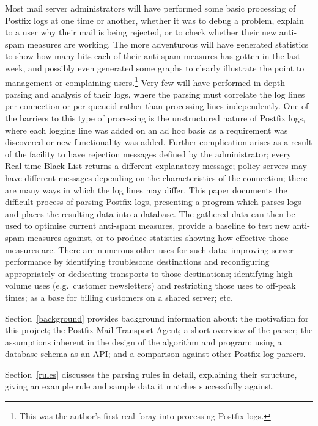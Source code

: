 \documentclass[a4paper,12pt,draft]{article}
\begin{document}
Most mail server administrators will have performed some basic processing
of Postfix logs at one time or another, whether it was to debug a problem,
explain to a user why their mail is being rejected, or to check whether
their new anti-spam measures are working.  The more adventurous will have
generated statistics to show how many hits each of their anti-spam measures
has gotten in the last week, and possibly even generated some graphs to
clearly illustrate the point to management or complaining
users.\footnote{This was the author's first real foray into processing
Postfix logs.}  Very few will have performed in-depth parsing and analysis
of their logs, where the parsing must correlate the log lines
per-connection or per-queueid rather than processing lines independently.
One of the barriers to this type of processing is the unstructured nature
of Postfix logs, where each logging line was added on an ad hoc basis as a
requirement was discovered or new functionality was added.  Further
complication arises as a result of the facility to have rejection messages
defined by the administrator; every Real-time Black List returns a
different explanatory message; policy servers may have different messages
depending on the characteristics of the connection; there are many ways in
which the log lines may differ.  This paper documents the difficult process
of parsing Postfix logs, presenting a program which parses logs and places
the resulting data into a database.  The gathered data can then be used to
optimise current anti-spam measures, provide a baseline to test new
anti-spam measures against, or to produce statistics showing how effective
those measures are.  There are numerous other uses for such data: improving
server performance by identifying troublesome destinations and
reconfiguring appropriately or dedicating transports to those destinations;
identifying high volume uses (e.g.\ customer newsletters) and restricting
those uses to off-peak times; as a base for billing customers on a shared
server; etc.

Section~\ref{background} provides background information about: the
motivation for this project; the Postfix Mail Transport Agent; a short
overview of the parser; the assumptions inherent in the design of the
algorithm and program; using a database schema as an API\@; and a
comparison against other Postfix log parsers.

Section~\ref{rules} discusses the parsing rules in detail, explaining their
structure, giving an example rule and sample data it matches successfully
against.
\end{document}
